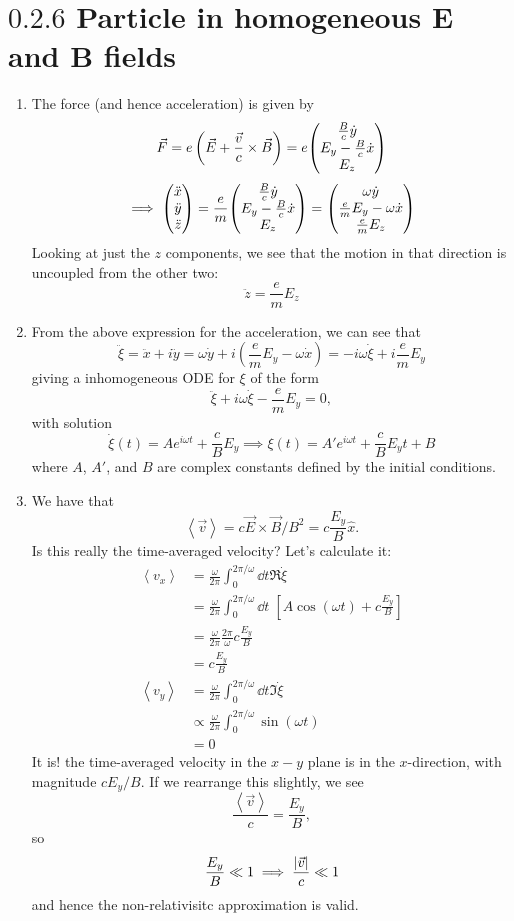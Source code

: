 \documentclass[12pt]{article}
\newcommand{\avg}[1]{\left<#1\right>}
\begin{document}
\section*{$0.2.6$ Particle in homogeneous $\mathbf{E}$ and $\mathbf{B}$ fields}
\begin{enumerate}[label=(\alph*)]
    \item The force (and hence acceleration) is given by
    \[ \vec{F} = e\left(\vec{E} + \frac{\vec{v}}{c}\times\vec{B}\right) = e\mqty(\frac{B}{c}\dot{y} \\ E_y - \frac{B}{c}\dot{x} \\ E_z)  \]
    \[ \implies \mqty(\ddot{x} \\ \ddot{y} \\ \ddot{z}) = \frac{e}{m}\mqty(\frac{B}{c}\dot{y} \\ E_y - \frac{B}{c}\dot{x} \\ E_z) = \mqty(\omega\dot{y} \\ \frac{e}{m}E_y - \omega\dot{x} \\ \frac{e}{m}E_z)\]
    Looking at just the $z$ components, we see that the motion in that direction is uncoupled from the other two:
    \[ \ddot{z} = \frac{e}{m}E_z \]

    \item From the above expression for the acceleration, we can see that
    \[ \ddot{\xi} = \ddot{x} + i\ddot{y} = \omega\dot{y} + i\left(\frac{e}{m}E_y - \omega\dot{x}\right) = -i\omega\dot{\xi} + i\frac{e}{m}E_y \]
    giving a inhomogeneous ODE for $\xi$ of the form
    \[ \ddot{\xi} + i\omega\dot{\xi} - \frac{e}{m}E_y = 0, \]
    with solution
    \[ \dot{\xi}(t) = Ae^{i\omega t} + \frac{c}{B}E_y \implies \xi(t) = A'e^{i\omega t} + \frac{c}{B}E_yt + B\]
    where $A$, $A'$, and $B$ are complex constants defined by the initial conditions.
    
    \item We have that
    \[ \avg{\vec{v}} = c\vec{E}\times\vec{B}/B^2 = c\frac{E_y}{B}\hat{x}. \]
    Is this really the time-averaged velocity? Let's calculate it:
    \begin{align*}
        \avg{v_x} &= \frac{\omega}{2\pi}\int_0^{2\pi/\omega}\dd t \Re{\dot{\xi}} \\
        &= \frac{\omega}{2\pi}\int_0^{2\pi/\omega}\dd t\; \left[A\cos(\omega t) + c\frac{E_y}{B}\right] \\
        &= \frac{\omega}{2\pi}\frac{2\pi}{\omega}c\frac{E_y}{B} \\
        &= c\frac{E_y}{B} \\
        \avg{v_y} &= \frac{\omega}{2\pi}\int_0^{2\pi/\omega}\dd t \Im{\dot{\xi}} \\
        &\propto \frac{\omega}{2\pi}\int_0^{2\pi/\omega}\sin(\omega t) \\
        &= 0
    \end{align*}
    It is! the time-averaged velocity in the $x-y$ plane is in the $x$-direction, with magnitude $cE_y/B$. If we rearrange this slightly, we see
    \[ \frac{\avg{\vec{v}}}{c} = \frac{E_y}{B}, \]
    so
    \[ \frac{E_y}{B} \ll 1 \implies \frac{\abs{\vec{v}}}{c} \ll 1 \]
    and hence the non-relativisitc approximation is valid.
    

\end{enumerate}
\end{document}
